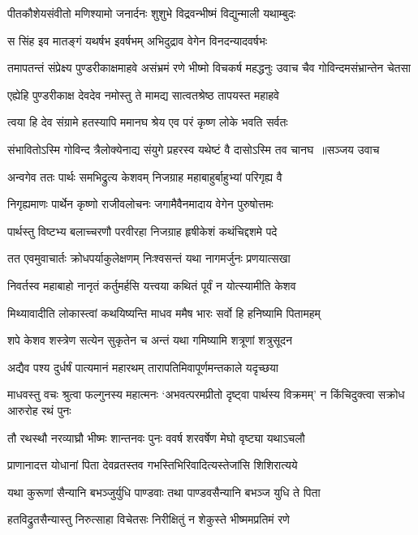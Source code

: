 \twolineshloka
{पीतकौशेयसंवीतो मणिश्यामो जनार्दनः}
{शुशुभे विद्रवन्भीष्मं विद्युन्माली यथाम्बुदः}


\twolineshloka
{स सिंह इव मातङ्गं यथर्षभ इवर्षभम्}
{अभिदुद्राव वेगेन विनदन्यादवर्षभः}


\threelineshloka
{तमापतन्तं संप्रेक्ष्य पुण्डरीकाक्षमाहवे}
{असंभ्रमं रणे भीष्मो विचकर्ष महद्धनुः}
{उवाच चैव गोविन्दमसंभ्रान्तेन चेतसा}


\twolineshloka
{एह्येहि पुण्डरीकाक्ष देवदेव नमोस्तु ते}
{मामद्य सात्वतश्रेष्ठ तापयस्त महाहवे}


\twolineshloka
{त्वया हि देव संग्रामे हतस्यापि ममानघ}
{श्रेय एव परं कृष्ण लोके भवति सर्वतः}


\threelineshloka
{संभावितोऽस्मि गोविन्द त्रैलोक्येनाद्य संयुगे}
{प्रहरस्व यथेष्टं वै दासोऽस्मि तव चानघ ॥सञ्जय उवाच}
{}


\twolineshloka
{अन्वगेव ततः पार्थः समभिद्रुत्य केशवम्}
{निजग्राह महाबाहुर्बाहुभ्यां परिगृह्य वै}


\twolineshloka
{निगृह्यमाणः पार्थेन कृष्णो राजीवलोचनः}
{जगामैवैनमादाय वेगेन पुरुषोत्तमः}


\twolineshloka
{पार्थस्तु विष्टभ्य बलाच्चरणौ परवीरहा}
{निजग्राह हृषीकेशं कथंचिद्दशमे पदे}


\twolineshloka
{तत एवमुवाचार्तः क्रोधपर्याकुलेक्षणम्}
{निःश्वसन्तं यथा नागमर्जुनः प्रणयात्सखा}


\twolineshloka
{निवर्तस्व महाबाहो नानृतं कर्तुमर्हसि}
{यत्त्वया कथितं पूर्वं न योत्स्यामीति केशव}


\twolineshloka
{मिथ्यावादीति लोकास्त्वां कथयिष्यन्ति माधव}
{ममैष भारः सर्वो हि हनिष्यामि पितामहम्}


\twolineshloka
{शपे केशव शस्त्रेण सत्येन सुकृतेन च}
{अन्तं यथा गमिष्यामि शत्रूणां शत्रुसूदन}


\twolineshloka
{अद्यैव पश्य दुर्धर्षं पात्यमानं महारथम्}
{तारापतिमिवापूर्णमन्तकाले यदृच्छया}


\threelineshloka
{माधवस्तु वचः श्रुत्वा फल्गुनस्य महात्मनः}
{`अभवत्परमप्रीतो दृष्ट्वा पार्थस्य विक्रमम्'}
{न किंचिदुक्त्वा सक्रोध आरुरोह रथं पुनः}


\twolineshloka
{तौ रथस्थौ नरव्याघ्रौ भीष्मः शान्तनवः पुनः}
{ववर्ष शरवर्षेण मेघो वृष्ट्या यथाऽचलौ}


\twolineshloka
{प्राणानादत्त योधानां पिता देवव्रतस्तव}
{गभस्तिभिरिवादित्यस्तेजांसि शिशिरात्यये}


\twolineshloka
{यथा कुरूणां सैन्यानि बभञ्जुर्युधि पाण्डवाः}
{तथा पाण्डवसैन्यानि बभञ्ज युधि ते पिता}


\twolineshloka
{हतविद्रुतसैन्यास्तु निरुत्साहा विचेतसः}
{निरीक्षितुं न शेकुस्ते भीष्ममप्रतिमं रणे}



